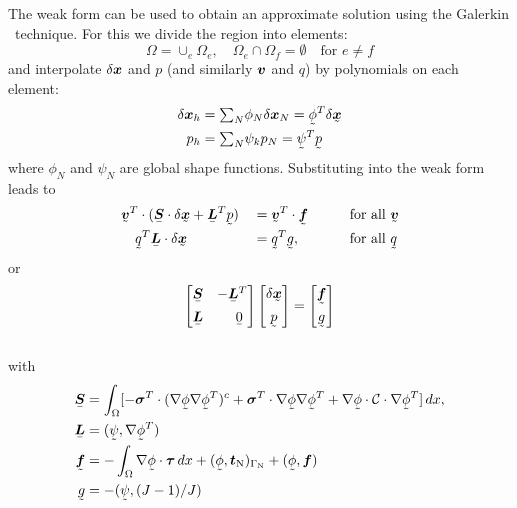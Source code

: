 The weak form can be used to obtain an approximate solution using 
the Galerkin \fem\ technique. For this we divide the region into elements:
\[
\Omega=\cup_e\Omega_e, \quad\Omega_{e}\cap\Omega_{f}=\emptyset\quad
   \text{for }e\neq f
\]
and interpolate $\delta\boldsymbol{x}$ and $p$ (and similarly $\boldsymbol{v}$ and $q$) by
polynomials on each element:
\[
 \begin{split}
    \delta\vek x_h&=\tsum_N \phi_N\delta\vek x_N=
           \col\phi^T\delta\col{\vek x}\\
    p_h&=\tsum_N \psi_k p_N=\col\psi^T\col{ p}
 \end{split}
\]
where $\phi_N$ and $\psi_N$ are global shape functions. Substituting into the
weak form leads to
\begin{alignat*}{3}
   &\col{\vek v}^T\cdot(\mat{\ten S}\cdot\delta\col{\vek x}+
               \mat{\vek L}^T\col p)&&=
    \col{\vek v}^T\cdot\col{\vek f}\qquad&&\text{for all }\col{\vek v}\\
   &\quad\col q^T\mat{\vek L}\cdot\delta\col{\vek x}&&=\col q^T\col g,\qquad&&\text{for all
}\col{q}\end{alignat*}
or
\begin{equation}
 \begin{bmatrix}
   \mat{\ten S} &-\mat{\vek L}^T \\[1ex]
  \mat{\vek L} &\quad \mat 0
 \end{bmatrix}
 \begin{bmatrix}
    \delta\col{\vek x}\\[1ex]
    \col p
 \end{bmatrix}=
 \begin{bmatrix}
    \col{\vek f}\\[1ex]
    \col g
 \end{bmatrix}
  \label{eq:deltax}
\end{equation}\medskip\\
with 
\begin{align*}
   \mat{\ten S}&= \int_\Omega[
   -\ten\sigma^T\cdot(\nabla\col\phi\nabla\col\phi^T)^c 
   +\ten\sigma^T\cdot\nabla\col\phi\nabla\col\phi^T
   +\nabla\col\phi\cdot\mathcal{C}\cdot\nabla\col\phi^T
 ]\D x,\\
\mat{\vek L}&=(\col{\psi},\nabla\col\phi^T)\\
 \col{\vek f}&=-\int_\Omega \nabla\col\phi\cdot\ten\tau\D x+(\col{\phi},\vek t_{\text{N}})_{\Gamma_{\text{N}}}+(\col{\phi},\vek f)\\
 \col{g}&=-(\col{\psi},(J-1)/J)
\end{align*}
